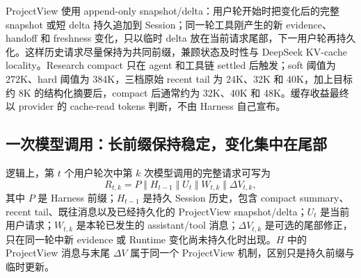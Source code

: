 \documentclass[UTF8,11pt,a4paper,fontset=fandol]{ctexart}
\begin{document}
ProjectView 使用 append-only snapshot/delta：用户轮开始时把变化后的完整 snapshot 或短 delta 持久追加到 Session；同一轮工具刚产生的新 evidence、handoff 和 freshness 变化，只以临时 delta 放在当前请求尾部，下一用户轮再持久化。这样历史请求尽量保持为共同前缀，兼顾状态及时性与 DeepSeek KV-cache locality。Research compact 只在 agent 和工具链 settled 后触发；soft 阈值为 272K、hard 阈值为 384K，三档原始 recent tail 为 24K、32K 和 40K，加上目标约 8K 的结构化摘要后，compact 后通常约为 32K、40K 和 48K。缓存收益最终以 provider 的 cache-read tokens 判断，不由 Harness 自己宣布。

\subsection{一次模型调用：长前缀保持稳定，变化集中在尾部}

逻辑上，第 $t$ 个用户轮次中第 $k$ 次模型调用的完整请求可写为
\[
R_{t,k}=P\;\Vert\;H_{t-1}\;\Vert\;U_t\;\Vert\;W_{t,k}\;\Vert\;\Delta V_{t,k},
\]
其中 $P$ 是 Harness 前缀；$H_{t-1}$ 是持久 Session 历史，包含 compact summary、recent tail、既往消息以及已经持久化的 ProjectView snapshot/delta；$U_t$ 是当前用户请求；$W_{t,k}$ 是本轮已发生的 assistant/tool 消息；$\Delta V_{t,k}$ 是可选的尾部修正，只在同一轮中新 evidence 或 Runtime 变化尚未持久化时出现。$H$ 中的 ProjectView 消息与末尾 $\Delta V$ 属于同一个 ProjectView 机制，区别只是持久前缀与临时更新。
\end{document}

